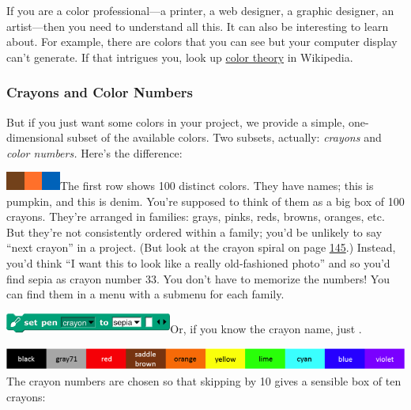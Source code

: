 If you are a color professional---a printer, a web designer, a graphic
designer, an artist---then you need to understand all this. It can also
be interesting to learn about. For example, there are colors that you
can see but your computer display can't generate. If that intrigues you,
look up \href{https://en.wikipedia.org/wiki/Color_theory}{color theory}
in Wikipedia.

\subsubsection{Crayons and Color
Numbers}\label{crayons-and-color-numbers}

But if you just want some colors in your project, we provide a simple,
one-dimensional subset of the available colors. Two subsets, actually:
\emph{crayons} and \emph{color numbers.} Here's the difference:

\includegraphics[width=0.23611in,height=0.23611in]{media/image1144.png}\includegraphics[width=0.23611in,height=0.23611in]{media/image1145.png}\includegraphics[width=0.23611in,height=0.23611in]{media/image1146.png}The
first row shows 100 distinct colors. They have names; this is pumpkin,
and this is denim. You're supposed to think of them as a big box of 100
crayons. They're arranged in families: grays, pinks, reds, browns,
oranges, etc. But they're not consistently ordered within a family;
you'd be unlikely to say ``next crayon'' in a project. (But look at the
crayon spiral on page \hyperref[spirals]{145}.) Instead, you'd think ``I
want this to look like a really old-fashioned photo'' and so you'd find
sepia as crayon number 33. You don't have to memorize the numbers! You
can find them in a menu with a submenu for each family.

\includegraphics[width=2.15972in,height=0.25694in]{media/image1147.png}Or,
if you know the crayon name, just .

\includegraphics[width=5.79306in,height=0.3in]{media/image1154.png}The
crayon numbers are chosen so that skipping by 10 gives a sensible box of
ten crayons:

